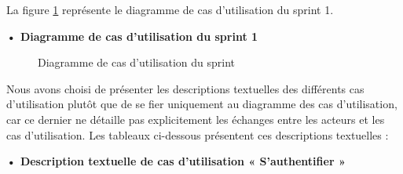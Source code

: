 La figure \ref{fig:UseCaseDiagram1} représente le diagramme de cas d'utilisation du sprint 1.

\textbf{•	Diagramme de cas d'utilisation du sprint 1}
\begin{figure}[H]
  \centering
  \caption{Diagramme de cas d'utilisation du sprint }
  \label{fig:UseCaseDiagram1}
\end{figure}


Nous avons choisi de présenter les descriptions textuelles des différents cas d'utilisation plutôt que de se fier uniquement au diagramme des cas d'utilisation, car ce dernier ne détaille pas explicitement les échanges entre les acteurs et les cas d'utilisation. Les tableaux ci-dessous présentent ces descriptions textuelles :


\textbf{•	Description textuelle de cas d'utilisation « S'authentifier »}

